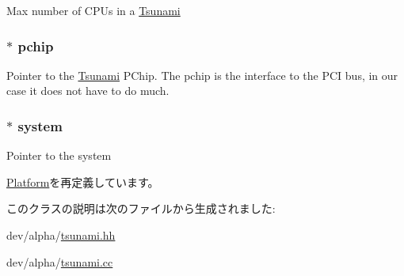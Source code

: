 \label{classTsunami_ab15ce4af0fe2c47746a30bafa34ced51}
Max number of CPUs in a \hyperlink{classTsunami}{Tsunami} \hypertarget{classTsunami_aff5dc15395b4de17c7cefb01a627f822}{
\subsubsection[{pchip}]{$\ast$ {\bf pchip}}}
\label{classTsunami_aff5dc15395b4de17c7cefb01a627f822}
Pointer to the \hyperlink{classTsunami}{Tsunami} PChip. The pchip is the interface to the PCI bus, in our case it does not have to do much. \hypertarget{classTsunami_af27ccd765f13a4b7bd119dc7579e2746}{
\subsubsection[{system}]{$\ast$ {\bf system}}}
\label{classTsunami_af27ccd765f13a4b7bd119dc7579e2746}
Pointer to the system 

\hyperlink{classPlatform_af27ccd765f13a4b7bd119dc7579e2746}{Platform}を再定義しています。

このクラスの説明は次のファイルから生成されました:\begin{DoxyCompactItemize}
\item 
dev/alpha/\hyperlink{tsunami_8hh}{tsunami.hh}\item 
dev/alpha/\hyperlink{tsunami_8cc}{tsunami.cc}\end{DoxyCompactItemize}
